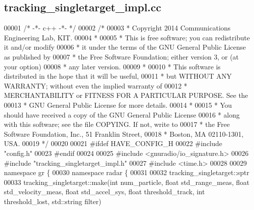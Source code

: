 \subsection{tracking\+\_\+singletarget\+\_\+impl.\+cc}
\label{tracking__singletarget__impl_8cc_source}

\begin{DoxyCode}
00001 \textcolor{comment}{/* -*- c++ -*- */}
00002 \textcolor{comment}{/* }
00003 \textcolor{comment}{ * Copyright 2014 Communications Engineering Lab, KIT.}
00004 \textcolor{comment}{ * }
00005 \textcolor{comment}{ * This is free software; you can redistribute it and/or modify}
00006 \textcolor{comment}{ * it under the terms of the GNU General Public License as published by}
00007 \textcolor{comment}{ * the Free Software Foundation; either version 3, or (at your option)}
00008 \textcolor{comment}{ * any later version.}
00009 \textcolor{comment}{ * }
00010 \textcolor{comment}{ * This software is distributed in the hope that it will be useful,}
00011 \textcolor{comment}{ * but WITHOUT ANY WARRANTY; without even the implied warranty of}
00012 \textcolor{comment}{ * MERCHANTABILITY or FITNESS FOR A PARTICULAR PURPOSE.  See the}
00013 \textcolor{comment}{ * GNU General Public License for more details.}
00014 \textcolor{comment}{ * }
00015 \textcolor{comment}{ * You should have received a copy of the GNU General Public License}
00016 \textcolor{comment}{ * along with this software; see the file COPYING.  If not, write to}
00017 \textcolor{comment}{ * the Free Software Foundation, Inc., 51 Franklin Street,}
00018 \textcolor{comment}{ * Boston, MA 02110-1301, USA.}
00019 \textcolor{comment}{ */}
00020 
00021 \textcolor{preprocessor}{#ifdef HAVE\_CONFIG\_H}
00022 \textcolor{preprocessor}{#include "config.h"}
00023 \textcolor{preprocessor}{#endif}
00024 
00025 \textcolor{preprocessor}{#include <gnuradio/io\_signature.h>}
00026 \textcolor{preprocessor}{#include "tracking_singletarget_impl.h"}
00027 \textcolor{preprocessor}{#include <time.h>}
00028 
00029 \textcolor{keyword}{namespace }gr \{
00030   \textcolor{keyword}{namespace }radar \{
00031 
00032     tracking_singletarget::sptr
00033     tracking_singletarget::make(\textcolor{keywordtype}{int} num\_particle, \textcolor{keywordtype}{float} std\_range\_meas, \textcolor{keywordtype}{float} std\_velocity\_meas, \textcolor{keywordtype}{float} 
      std\_accel\_sys, \textcolor{keywordtype}{float} threshold\_track, \textcolor{keywordtype}{int} threshold\_lost, std::string filter)

\end{DoxyCode}
